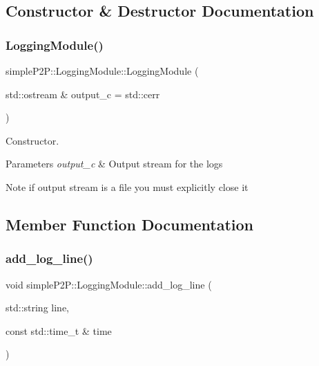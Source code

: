 \subsection{Constructor \& Destructor Documentation}
\mbox{\label{classsimpleP2P_1_1LoggingModule_abdd131c9caa8d9472a1a60a3d3f72be1}} 
\subsubsection{\texorpdfstring{Logging\+Module()}{LoggingModule()}}
{\footnotesize\ttfamily simple\+P2\+P\+::\+Logging\+Module\+::\+Logging\+Module (\begin{DoxyParamCaption}\item[{std\+::ostream \&}]{output\+\_\+c = {\ttfamily std\+:\+:cerr} }\end{DoxyParamCaption})}



Constructor. 


\begin{DoxyParams}{Parameters}
{\em output\+\_\+c} & Output stream for the logs \\
\hline
\end{DoxyParams}
\begin{DoxyNote}{Note}
if output stream is a file you must explicitly close it 
\end{DoxyNote}


\subsection{Member Function Documentation}
\mbox{\label{classsimpleP2P_1_1LoggingModule_ac251f998da1ac3e7fb7452012a024d46}} 
\subsubsection{\texorpdfstring{add\+\_\+log\+\_\+line()}{add\_log\_line()}}
{\footnotesize\ttfamily void simple\+P2\+P\+::\+Logging\+Module\+::add\+\_\+log\+\_\+line (\begin{DoxyParamCaption}\item[{std\+::string}]{line,  }\item[{const std\+::time\+\_\+t \&}]{time }\end{DoxyParamCaption})}



